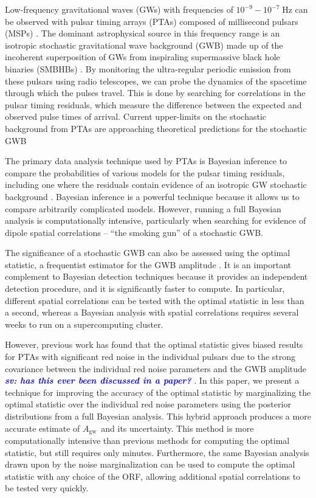 \documentclass[twocolumn,aps,prd,superscriptaddress]{revtex4-1}
\newcommand{\sv}[1]{\textcolor{blue}{\it{\textbf{sv: #1}}} }
\newcommand{\Agw}{\ensuremath{A_\mathrm{gw}}}
\begin{document}
Low-frequency gravitational waves (GWs) with frequencies of 
$10^{-9} - 10^{-7} \; \mathrm{Hz}$ can be observed with pulsar timing arrays (PTAs) 
composed of millisecond pulsars (MSPs) \cite{hd1983,fb1990}. 
The dominant astrophysical source in this frequency range is an isotropic stochastic 
gravitational wave background (GWB) 
made up of the incoherent superposition of GWs from inspiraling 
supermassive black hole binaries (SMBHBs) 
\citep{1995ApJ...446..543R, 2003ApJ...583..616J, 2003ApJ...590..691W}. 
By monitoring the ultra-regular periodic emission from these pulsars using radio telescopes, 
we can probe the dynamics of the spacetime through which the pulses travel. 
This is done by searching for correlations in the pulsar timing residuals, 
which measure the difference between the expected and observed pulse times of arrival. 
Current upper-limits on the stochastic background from PTAs are approaching 
theoretical predictions for the stochastic GWB \citep{PPTA2013,EPTA2015,NANOGrav9yr}

The primary data analysis technique used by PTAs is Bayesian inference 
to compare the probabilities of various models for the pulsar timing residuals, 
including one where the residuals contain evidence of an isotropic GW stochastic background 
\citep{vlm+2009,lah+2013}. 
Bayesian inference is a powerful technique because it allows us to compare arbitrarily complicated models. 
However, running a full Bayesian analysis is computationally intensive, 
particularly when searching for evidence of dipole spatial correlations -- 
``the smoking gun'' of a stochastic GWB.

The significance of a stochastic GWB can also be assessed using the 
optimal statistic, a frequentist estimator for the GWB amplitude \citep{abc+2009,demorest+2013,ccs+2015}. 
It is an important complement to Bayesian detection techniques 
because it provides an independent detection procedure, 
and it is significantly faster to compute. 
In particular, different spatial correlations can be tested with the optimal statistic 
in less than a second, 
whereas a Bayesian analysis with spatial correlations requires 
several weeks to run on a supercomputing cluster.

However, previous work has found that the optimal statistic gives biased results 
for PTAs with significant red noise in the individual pulsars due to the 
strong covariance between the individual red noise parameters 
and the GWB amplitude \sv{has this ever been discussed in a paper?}. 
In this paper, we present a technique for improving the accuracy of the optimal statistic 
by marginalizing the optimal statistic over the individual red noise parameters 
using the posterior distributions from a full Bayesian analysis. 
This hybrid approach produces a more accurate 
estimate of \Agw\ and its uncertainty. 
This method is more computationally intensive than previous methods 
for computing the optimal statistic, but still requires only minutes. 
Furthermore, the same Bayesian analysis drawn upon by the noise marginalization 
can be used to compute the optimal statistic with any choice of the ORF, 
allowing additional spatial correlations to be tested very quickly.
\end{document}

